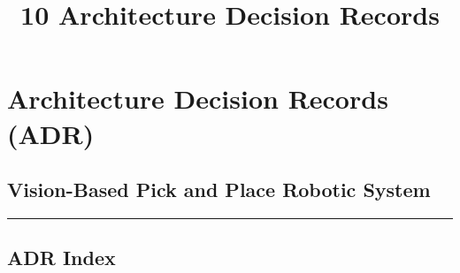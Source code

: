 \documentclass[
]{article}
\title{10 Architecture Decision Records}
\author{}
\date{}
\begin{document}
\maketitle

{
\setcounter{tocdepth}{3}
\tableofcontents
}
\hypertarget{architecture-decision-records-adr}{%
\section{Architecture Decision Records
(ADR)}\label{architecture-decision-records-adr}}

\hypertarget{vision-based-pick-and-place-robotic-system}{%
\subsection{Vision-Based Pick and Place Robotic
System}\label{vision-based-pick-and-place-robotic-system}}

\begin{center}\rule{0.5\linewidth}{0.5pt}\end{center}

\hypertarget{adr-index}{%
\subsection{ADR Index}\label{adr-index}}
\end{document}
